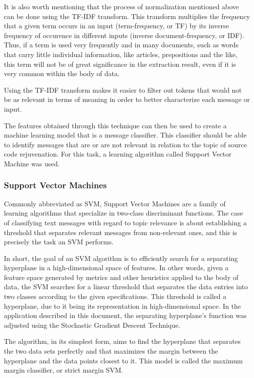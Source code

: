 It is also worth mentioning that the process of normalization mentioned above can be done using the TF-IDF transform. This transform multiplies the frequency that a given term occurs in an input (term-frequency, or TF) by its inverse frequency of occurence in different inputs (inverse document-frequency, or IDF). Thus, if a term is used very frequently and in many documents, such as words that carry little individual information, like articles, prepositions and the like, this term will not be of great significance in the extraction result, even if it is very common within the body of data.

Using the TF-IDF transform makes it easier to filter out tokens that would not be as relevant in terms of meaning in order to better characterize each message or input.

The features obtained through this technique can then be used to create a machine learning model that is a message classifier. This classifier should be able to identify messages that are or are not relevant in relation to the topic of source code rejuvenation. For this task, a learning algorithm called Support Vector Machine was used.

\subsubsection{Support Vector Machines}
Commonly abbreviated as SVM, Support Vector Machines are a family of learning algorithms that specialize in two-class discriminant functions. \cite{mammone2009support} The case of classifying text messages with regard to topic relevance is about establishing a threshold that separates relevant messages from non-relevant ones, and this is precisely the task an SVM performs.

In short, the goal of an SVM algorithm is to efficiently search for a separating hyperplane in a high-dimensional space of features. \cite{mammone2009support} In other words, given a feature space generated by metrics and other heuristics applied to the body of data, the SVM searches for a linear threshold that separates the data entries into two classes according to the given specifications. This threshold is called a hyperplane, due to it being its representation in high-dimensional space. In the application described in this document, the separating hyperplane's function was adjusted using the Stochastic Gradient Descent Technique.

The algorithm, in its simplest form, aims to find the hyperplane that separates the two data sets perfectly and that maximizes the margin between the hyperplane and the data points closest to it. This model is called the maximum margin classifier, or strict margin SVM. \cite{mammone2009support}

